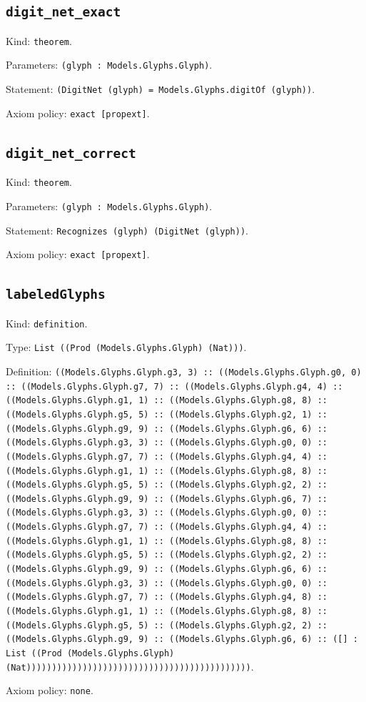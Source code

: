 \documentclass[11pt]{article}
\begin{document}
\subsection*{\texttt{digit\_net\_exact}}
\noindent Kind: \texttt{theorem}.\par
\noindent Parameters: \texttt{(glyph : Models.Glyphs.Glyph)}.\par
\noindent Statement: \texttt{(DigitNet (glyph) = Models.Glyphs.digitOf (glyph))}.\par
\noindent Axiom policy: \texttt{exact [propext]}.\par
\subsection*{\texttt{digit\_net\_correct}}
\noindent Kind: \texttt{theorem}.\par
\noindent Parameters: \texttt{(glyph : Models.Glyphs.Glyph)}.\par
\noindent Statement: \texttt{Recognizes (glyph) (DigitNet (glyph))}.\par
\noindent Axiom policy: \texttt{exact [propext]}.\par
\subsection*{\texttt{labeledGlyphs}}
\noindent Kind: \texttt{definition}.\par
\noindent Type: \texttt{List ((Prod (Models.Glyphs.Glyph) (Nat)))}.\par
\noindent Definition: \texttt{((Models.Glyphs.Glyph.g3, 3) :: ((Models.Glyphs.Glyph.g0, 0) :: ((Models.Glyphs.Glyph.g7, 7) :: ((Models.Glyphs.Glyph.g4, 4) :: ((Models.Glyphs.Glyph.g1, 1) :: ((Models.Glyphs.Glyph.g8, 8) :: ((Models.Glyphs.Glyph.g5, 5) :: ((Models.Glyphs.Glyph.g2, 1) :: ((Models.Glyphs.Glyph.g9, 9) :: ((Models.Glyphs.Glyph.g6, 6) :: ((Models.Glyphs.Glyph.g3, 3) :: ((Models.Glyphs.Glyph.g0, 0) :: ((Models.Glyphs.Glyph.g7, 7) :: ((Models.Glyphs.Glyph.g4, 4) :: ((Models.Glyphs.Glyph.g1, 1) :: ((Models.Glyphs.Glyph.g8, 8) :: ((Models.Glyphs.Glyph.g5, 5) :: ((Models.Glyphs.Glyph.g2, 2) :: ((Models.Glyphs.Glyph.g9, 9) :: ((Models.Glyphs.Glyph.g6, 7) :: ((Models.Glyphs.Glyph.g3, 3) :: ((Models.Glyphs.Glyph.g0, 0) :: ((Models.Glyphs.Glyph.g7, 7) :: ((Models.Glyphs.Glyph.g4, 4) :: ((Models.Glyphs.Glyph.g1, 1) :: ((Models.Glyphs.Glyph.g8, 8) :: ((Models.Glyphs.Glyph.g5, 5) :: ((Models.Glyphs.Glyph.g2, 2) :: ((Models.Glyphs.Glyph.g9, 9) :: ((Models.Glyphs.Glyph.g6, 6) :: ((Models.Glyphs.Glyph.g3, 3) :: ((Models.Glyphs.Glyph.g0, 0) :: ((Models.Glyphs.Glyph.g7, 7) :: ((Models.Glyphs.Glyph.g4, 8) :: ((Models.Glyphs.Glyph.g1, 1) :: ((Models.Glyphs.Glyph.g8, 8) :: ((Models.Glyphs.Glyph.g5, 5) :: ((Models.Glyphs.Glyph.g2, 2) :: ((Models.Glyphs.Glyph.g9, 9) :: ((Models.Glyphs.Glyph.g6, 6) :: ([] : List ((Prod (Models.Glyphs.Glyph) (Nat))))))))))))))))))))))))))))))))))))))))))))}.\par
\noindent Axiom policy: \texttt{none}.\par
\end{document}
